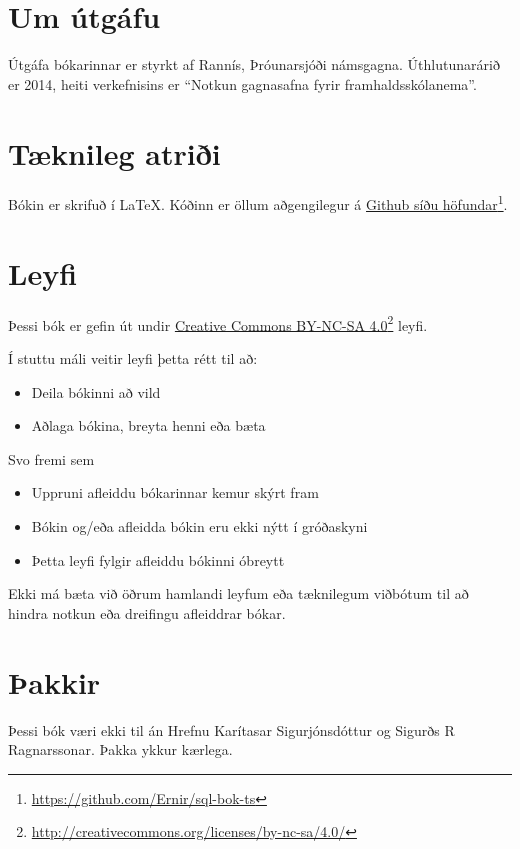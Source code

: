\section{Um útgáfu}
Útgáfa bókarinnar er styrkt af Rannís, Þróunarsjóði námsgagna. Úthlutunarárið er 2014, heiti verkefnisins er ``Notkun gagnasafna fyrir framhaldsskólanema''.
\section{Tæknileg atriði}
Bókin er skrifuð í \LaTeX. Kóðinn er öllum aðgengilegur á \href{https://github.com/Ernir/sql-bok-ts}{Github síðu höfundar}\footnote{\url{https://github.com/Ernir/sql-bok-ts}}.
\section{Leyfi}
Þessi bók er gefin út undir \href{http://creativecommons.org/licenses/by-nc-sa/4.0/}{Creative Commons BY-NC-SA 4.0}\footnote{\url{http://creativecommons.org/licenses/by-nc-sa/4.0/}} leyfi. 

Í stuttu máli veitir leyfi þetta rétt til að:
\begin{itemize}
 \item Deila bókinni að vild
 \item Aðlaga bókina, breyta henni eða bæta
\end{itemize}
Svo fremi sem
\begin{itemize}
 \item Uppruni afleiddu bókarinnar kemur skýrt fram
 \item Bókin og/eða afleidda bókin eru ekki nýtt í gróðaskyni
 \item Þetta leyfi fylgir afleiddu bókinni óbreytt
\end{itemize}
Ekki má bæta við öðrum hamlandi leyfum eða tæknilegum viðbótum til að hindra notkun eða dreifingu afleiddrar bókar.

\section*{Þakkir}
Þessi bók væri ekki til án Hrefnu Karítasar Sigurjónsdóttur og Sigurðs R Ragnarssonar. Þakka ykkur kærlega.